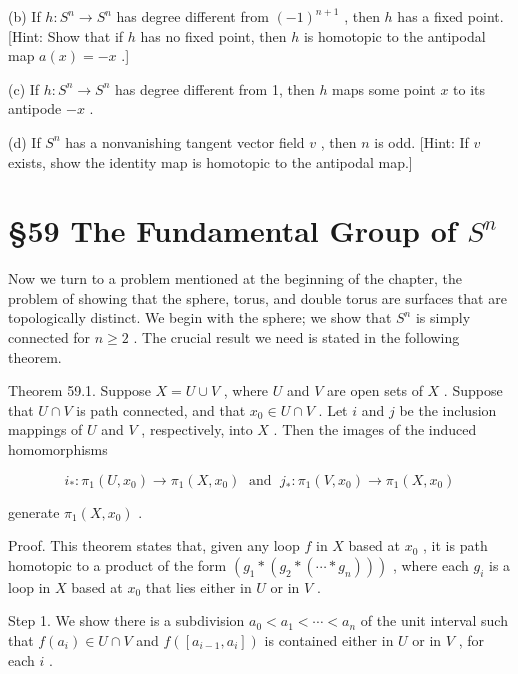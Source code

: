 (b) If \(h : {S}^{n} \rightarrow  {S}^{n}\) has degree different from \({\left( -1\right) }^{n + 1}\) , then \(h\) has a fixed point. [Hint: Show that if \(h\) has no fixed point, then \(h\) is homotopic to the antipodal map \(a\left( x\right)  =  - x\) .]

(c) If \(h : {S}^{n} \rightarrow  {S}^{n}\) has degree different from 1, then \(h\) maps some point \(x\) to its antipode \(- x\) .

(d) If \({S}^{n}\) has a nonvanishing tangent vector field \(v\) , then \(n\) is odd. [Hint: If \(v\) exists, show the identity map is homotopic to the antipodal map.]

\section*{§59 The Fundamental Group of \({S}^{n}\)}

Now we turn to a problem mentioned at the beginning of the chapter, the problem of showing that the sphere, torus, and double torus are surfaces that are topologically distinct. We begin with the sphere; we show that \({S}^{n}\) is simply connected for \(n \geq  2\) . The crucial result we need is stated in the following theorem.

Theorem 59.1. Suppose \(X = U \cup  V\) , where \(U\) and \(V\) are open sets of \(X\) . Suppose that \(U \cap  V\) is path connected, and that \({x}_{0} \in  U \cap  V\) . Let \(i\) and \(j\) be the inclusion mappings of \(U\) and \(V\) , respectively, into \(X\) . Then the images of the induced homomorphisms

\[
{i}_{ * } : {\pi }_{1}\left( {U,{x}_{0}}\right)  \rightarrow  {\pi }_{1}\left( {X,{x}_{0}}\right) \;\text{ and }\;{j}_{ * } : {\pi }_{1}\left( {V,{x}_{0}}\right)  \rightarrow  {\pi }_{1}\left( {X,{x}_{0}}\right)
\]

generate \({\pi }_{1}\left( {X,{x}_{0}}\right)\) .

Proof. This theorem states that, given any loop \(f\) in \(X\) based at \({x}_{0}\) , it is path homotopic to a product of the form \(\left( {{g}_{1} * \left( {{g}_{2} * \left( {\cdots  * {g}_{n}}\right) }\right) }\right)\) , where each \({g}_{i}\) is a loop in \(X\) based at \({x}_{0}\) that lies either in \(U\) or in \(V\) .

Step 1. We show there is a subdivision \({a}_{0} < {a}_{1} < \cdots  < {a}_{n}\) of the unit interval such that \(f\left( {a}_{i}\right)  \in  U \cap  V\) and \(f\left( \left\lbrack  {{a}_{i - 1},{a}_{i}}\right\rbrack  \right)\) is contained either in \(U\) or in \(V\) , for each \(i\) .

